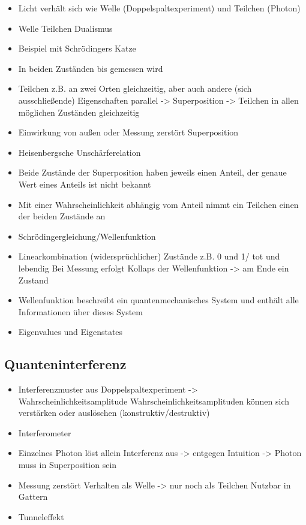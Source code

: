 \begin{itemize}
\item Licht verhält sich wie Welle (Doppelspaltexperiment) und Teilchen (Photon)
\item Welle Teilchen Dualismus
\item Beispiel mit Schrödingers Katze
\item In beiden Zuständen bis gemessen wird
\item Teilchen z.B. an zwei Orten gleichzeitig, aber auch andere (sich ausschließende) Eigenschaften parallel -> Superposition -> Teilchen in allen möglichen Zuständen gleichzeitig
\item Einwirkung von außen oder Messung zerstört Superposition
\item Heisenbergsche Unschärferelation
\item Beide Zustände der Superposition haben jeweils einen Anteil, der genaue Wert eines Anteils ist nicht bekannt
\item Mit einer Wahrscheinlichkeit abhängig vom Anteil nimmt ein Teilchen einen der beiden Zustände an

\item Schrödingergleichung/Wellenfunktion
\item Linearkombination (widersprüchlicher) Zustände z.B. 0 und 1/ tot und lebendig
Bei Messung erfolgt Kollaps der Wellenfunktion -> am Ende ein Zustand
\item Wellenfunktion beschreibt ein quantenmechanisches System und enthält alle Informationen über dieses System
\item Eigenvalues und Eigenstates
\end{itemize}

\subsection{Quanteninterferenz}

\begin{itemize}
\item Interferenzmuster aus Doppelspaltexperiment -> Wahrscheinlichkeitsamplitude
Wahrscheinlichkeitsamplituden können sich verstärken oder auslöschen (konstruktiv/destruktiv)
\item Interferometer
\item Einzelnes Photon löst allein Interferenz aus -> entgegen Intuition -> Photon muss in Superposition sein
\item Messung zerstört Verhalten als Welle -> nur noch als Teilchen
Nutzbar in Gattern
\item Tunneleffekt
\end{itemize}

